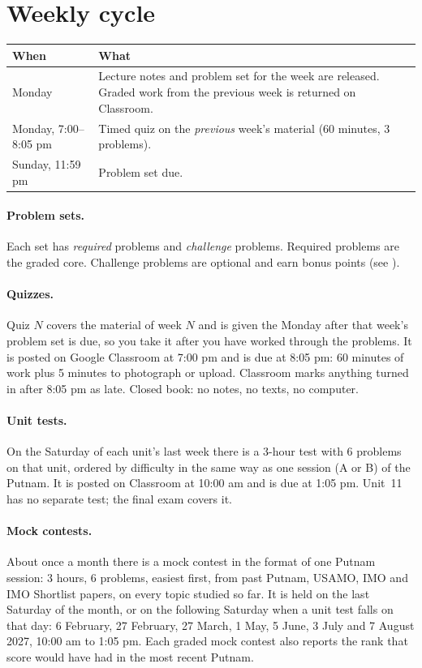 \documentclass[11pt]{scrartcl}
\begin{document}
\section{Weekly cycle}
\begin{center}
\begin{tabularx}{\linewidth}{lX}
  \toprule
  \textbf{When} & \textbf{What} \\
  \midrule
  Monday & Lecture notes and problem set for the week are released.
    Graded work from the previous week is returned on Classroom. \\
  Monday, 7:00--8:05 pm & Timed quiz on the \emph{previous} week's material (60 minutes, 3 problems). \\
  Sunday, 11:59 pm & Problem set due. \\
  \bottomrule
\end{tabularx}
\end{center}

\paragraph{Problem sets.}
Each set has \emph{required} problems and \emph{challenge} problems.
Required problems are the graded core. Challenge problems are optional and earn bonus points
(see ).

\paragraph{Quizzes.}
Quiz $N$ covers the material of week $N$ and is given the Monday after that week's problem set is due,
so you take it after you have worked through the problems.
It is posted on Google Classroom at 7:00 pm and is due at 8:05 pm: 60 minutes of work plus 5 minutes
to photograph or upload. Classroom marks anything turned in after 8:05 pm as late.
Closed book: no notes, no texts, no computer.

\paragraph{Unit tests.}
On the Saturday of each unit's last week there is a 3-hour test with 6 problems on that unit,
ordered by difficulty in the same way as one session (A or B) of the Putnam.
It is posted on Classroom at 10:00 am and is due at 1:05 pm. Unit~11 has no separate test;
the final exam covers it.

\paragraph{Mock contests.}
About once a month there is a mock contest in the format of one Putnam session: 3 hours, 6 problems,
easiest first, from past Putnam, USAMO, IMO and IMO Shortlist papers, on every topic studied so far.
It is held on the last Saturday of the month, or on the following Saturday when a unit test falls on that day:
6 February, 27 February, 27 March, 1 May, 5 June, 3 July and 7 August 2027, 10:00 am to 1:05 pm.
Each graded mock contest also reports the rank that score would have had in the most recent Putnam.
\end{document}
